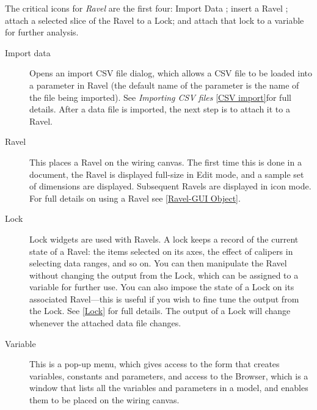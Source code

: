 The critical icons for \emph{Ravel} are the first four: Import Data
; insert a Ravel ;
attach a selected slice of the Ravel to a Lock; and attach that lock
to a variable for further analysis.
\begin{description}
\item [{Import data}]  Opens an import CSV
file dialog, which allows a CSV file to be loaded into a parameter
in Ravel (the default name of the parameter is the name of the file
being imported). See \emph{Importing CSV files} \ref{CSV import}for
full details. After a data file is imported, the next step is to attach
it to a Ravel.
\item [{Ravel}]  This places a Ravel on the
wiring canvas. The first time this is done in a document, the Ravel
is displayed full-size in Edit mode, and a sample set of dimensions
are displayed. Subsequent Ravels are displayed in icon mode. For full
details on using a Ravel see \ref{Ravel-GUI Object}.
\item [{Lock}]  Lock widgets are used with
Ravels. A lock keeps a record of the current state of a Ravel: the
items selected on its axes, the effect of calipers in selecting data
ranges, and so on. You can then manipulate the Ravel without changing
the output from the Lock, which can be assigned to a variable for
further use. You can also impose the state of a Lock on its associated
Ravel---this is useful if you wish to fine tune the output from the
Lock. See \ref{Lock} for full details. The output of a Lock will
change whenever the attached data file changes.
\item [{Variable}]  \label{Variable}
This is a pop-up menu, which gives access to the form that creates
variables, constants and parameters, and access to the Browser, which
is a window that lists all the variables and parameters in a model,
and enables them to be placed on the wiring canvas.


\end{description}
